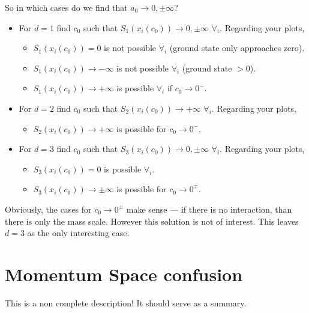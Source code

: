 \documentclass[
    aps,
    prl,
    showkeys,
    nofootinbib,
    floatfix
]{revtex4-1}
\begin{document}
So in which cases do we find that $a_0 \to 0, \pm \infty$?

\begin{itemize}
	\item For $d = 1$ find $c_0$ such that $S_1(x_i(c_0)) \to 0, \pm \infty$ $\forall_i$.
		Regarding your plots,
		\begin{itemize}
			\item $S_1(x_i(c_0)) = 0$ is not possible $\forall_i$ (ground state only approaches zero).
			\item $S_1(x_i(c_0)) \to - \infty$ is not possible $\forall_i$ (ground state $>0$).
			\item $S_1(x_i(c_0)) \to + \infty$ is possible $\forall_i$ if $c_0 \to 0^-$.
		\end{itemize}
	\item For $d = 2$ find $c_0$ such that $S_2(x_i(c_0)) \to + \infty$ $\forall_i$.
		Regarding your plots,
		\begin{itemize}
			\item $S_2(x_i(c_0)) \to + \infty$ is possible for $c_0 \to 0^-$.
		\end{itemize}
	\item For $d = 3$ find $c_0$ such that $S_3(x_i(c_0)) \to 0, \pm \infty$ $\forall_i$.
		Regarding your plots,
		\begin{itemize}
			\item $S_3(x_i(c_0)) = 0$ is possible $\forall_i$.
			\item $S_3(x_i(c_0)) \to \pm \infty$ is possible for $c_0 \to 0^\mp$.
		\end{itemize}
\end{itemize}

Obviously, the cases for $c_0 \to 0^\pm$ make sense --- if there is no interaction, than there is only the mass scale.
However this solution is not of interest.
This leaves $d=3$ as the only interesting case.

\newpage
\section{Momentum Space confusion}
This is a non complete description!
It should serve as a summary.
\end{document}
